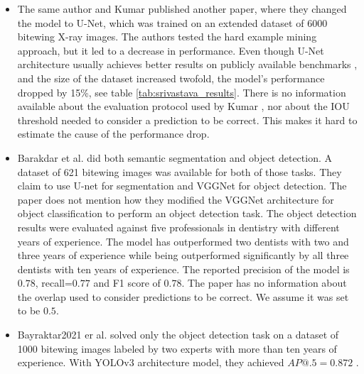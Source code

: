 \begin{itemize}
    \item{The same author and Kumar \cite{Kumar2018}} published another paper, where they changed the model to U-Net, which was trained on an extended dataset of 6000 bitewing X-ray images. The authors tested the hard example mining approach, but it led to a decrease in performance. Even though U-Net architecture usually achieves better results on publicly available benchmarks \cite{paperwithcode, Zhang2019}, and the size of the dataset increased twofold, the model's performance dropped by 15\%, see table \ref{tab:srivastava_results}. There is no information available about the evaluation protocol used by Kumar \cite{Kumar2018}, nor about the IOU threshold needed to consider a prediction to be correct. This makes it hard to estimate the cause of the performance drop.
    \item{Barakdar et al. \cite{Bayrakdar2021}} did both semantic segmentation and object detection. A dataset of 621 bitewing images was available for both of those tasks. They claim to use U-net for segmentation and VGGNet for object detection. The paper does not mention how they modified the VGGNet architecture for object classification to perform an object detection task. The object detection results were evaluated against five professionals in dentistry with different years of experience. The model has outperformed two dentists with  two and  three years of experience while being outperformed significantly by all three dentists with ten years of experience. The reported precision of the model is $0.78$, recall=$0.77$ and F1 score of $0.78$. The paper has no information about the overlap used to consider predictions to be correct. We assume it was set to be $0.5$.
    \item{Bayraktar2021 er al. \cite{Bayraktar2021}} solved only the object detection task on a dataset of 1000 bitewing images labeled by two experts with more than ten years of experience. With YOLOv3 architecture model, they achieved $AP@.5 = 0.872$ .
\end{itemize}

